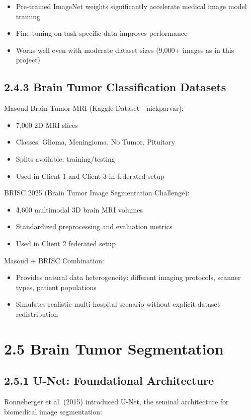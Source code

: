 \begin{itemize}
  \item Pre-trained ImageNet weights significantly accelerate medical image model training
  \item Fine-tuning on task-specific data improves performance
  \item Works well even with moderate dataset sizes (9,000+ images as in this project)
\end{itemize}


\subsection{2.4.3 Brain Tumor Classification Datasets}
Masoud Brain Tumor MRI (Kaggle Dataset - nickparvar):

\begin{itemize}
  \item \~7,000 2D MRI slices
  \item Classes: Glioma, Meningioma, No Tumor, Pituitary
  \item Splits available: training/testing
  \item Used in Client 1 and Client 3 in federated setup
\end{itemize}

BRISC 2025 (Brain Tumor Image Segmentation Challenge):

\begin{itemize}
  \item \~4,600 multimodal 3D brain MRI volumes
  \item Standardized preprocessing and evaluation metrics
  \item Used in Client 2 federated setup
\end{itemize}

Masoud + BRISC Combination:

\begin{itemize}
  \item Provides natural data heterogeneity: different imaging protocols, scanner types, patient populations
  \item Simulates realistic multi-hospital scenario without explicit dataset redistribution
\end{itemize}


\section{2.5 Brain Tumor Segmentation}

\subsection{2.5.1 U-Net: Foundational Architecture}
Ronneberger et al. (2015) introduced U-Net, the seminal architecture for biomedical image segmentation:

